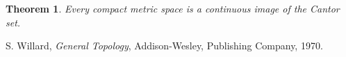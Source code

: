 \documentclass[12pt]{article}
\newtheorem*{thm*}{Theorem}
\begin{document}
\begin{thm*}
Every compact metric space is a continuous image of the Cantor set.
\end{thm*}

\begin{thebibliography}{9}
   S. Willard, \emph{General Topology},
    Addison-Wesley, Publishing Company, 1970.
\end{thebibliography}
\end{document}
